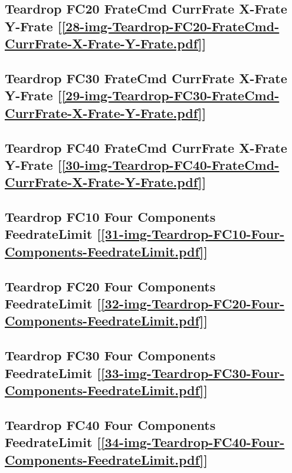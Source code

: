 \subsection       {Teardrop FC20 FrateCmd CurrFrate X-Frate Y-Frate
	[\ref      {28-img-Teardrop-FC20-FrateCmd-CurrFrate-X-Frate-Y-Frate.pdf}] }
\label{ssec-28-img-Teardrop-FC20-FrateCmd-CurrFrate-X-Frate-Y-Frate.pdf}

\subsection       {Teardrop FC30 FrateCmd CurrFrate X-Frate Y-Frate
	[\ref      {29-img-Teardrop-FC30-FrateCmd-CurrFrate-X-Frate-Y-Frate.pdf}] }
\label{ssec-29-img-Teardrop-FC30-FrateCmd-CurrFrate-X-Frate-Y-Frate.pdf}

\subsection       {Teardrop FC40 FrateCmd CurrFrate X-Frate Y-Frate
	[\ref      {30-img-Teardrop-FC40-FrateCmd-CurrFrate-X-Frate-Y-Frate.pdf}] }
\label{ssec-30-img-Teardrop-FC40-FrateCmd-CurrFrate-X-Frate-Y-Frate.pdf}

\subsection       {Teardrop FC10 Four Components FeedrateLimit
	[\ref      {31-img-Teardrop-FC10-Four-Components-FeedrateLimit.pdf}] }
\label{ssec-31-img-Teardrop-FC10-Four-Components-FeedrateLimit.pdf}

\subsection       {Teardrop FC20 Four Components FeedrateLimit
	[\ref      {32-img-Teardrop-FC20-Four-Components-FeedrateLimit.pdf}] }
\label{ssec-32-img-Teardrop-FC20-Four-Components-FeedrateLimit.pdf}

\subsection       {Teardrop FC30 Four Components FeedrateLimit
	[\ref      {33-img-Teardrop-FC30-Four-Components-FeedrateLimit.pdf}] }
\label{ssec-33-img-Teardrop-FC30-Four-Components-FeedrateLimit.pdf}

\subsection       {Teardrop FC40 Four Components FeedrateLimit
	[\ref      {34-img-Teardrop-FC40-Four-Components-FeedrateLimit.pdf}]}
\label{ssec-34-img-Teardrop-FC40-Four-Components-FeedrateLimit.pdf}

